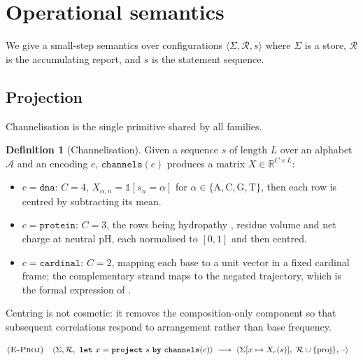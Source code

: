 \documentclass[11pt,twocolumn,a4paper]{article}
\theoremstyle{plain}
\theoremstyle{definition}
\newtheorem{definition}[theorem]{Definition}
\theoremstyle{remark}
\newcommand{\kw}[1]{\texttt{\textbf{#1}}}
\begin{document}
\section{Operational semantics}
\label{sec:semantics}

We give a small-step semantics \cite{plotkin2004structural} over
configurations $\langle \Sigma, \mathcal{R}, s\rangle$ where $\Sigma$ is
a store, $\mathcal{R}$ is the accumulating report, and $s$ is the
statement sequence.

\subsection{Projection}

Channelisation is the single primitive shared by all families.

\begin{definition}[Channelisation]
\label{def:channelise}
Given a sequence $s$ of length $L$ over an alphabet $\mathcal{A}$ and an
encoding $c$, $\texttt{channels}(c)$ produces a matrix
$X\in\mathbb{R}^{C\times L}$:
\begin{itemize}[leftmargin=1.4em]
\item $c=\texttt{dna}$: $C=4$, $X_{\alpha,n}=\mathbb{1}[s_n=\alpha]$ for
      $\alpha\in\{\mathrm{A,C,G,T}\}$, then each row is centred by
      subtracting its mean.
\item $c=\texttt{protein}$: $C=3$, the rows being hydropathy
      \cite{kyte1982simple}, residue volume
      \cite{zamyatnin1972protein} and net charge at neutral pH, each
      normalised to $[0,1]$ and then centred.
\item $c=\texttt{cardinal}$: $C=2$, mapping each base to a unit vector
      in a fixed cardinal frame; the complementary strand maps to the
      negated trajectory, which is the formal expression of
      .
\end{itemize}
Centring is not cosmetic: it removes the composition-only component so
that subsequent correlations respond to arrangement rather than base
frequency.
\end{definition}

\begin{align*}
&\textsc{(E-Proj)} &&
\langle \Sigma,\mathcal{R},\ \kw{let}\ x = \kw{project}\ s\ \kw{by}\ \texttt{channels}(c)\rangle
\;\longrightarrow\;
\langle \Sigma[x\mapsto X_{c}(s)],\ \mathcal{R}\cup\{\text{proj}\},\ \cdot\rangle
\end{align*}
\end{document}
